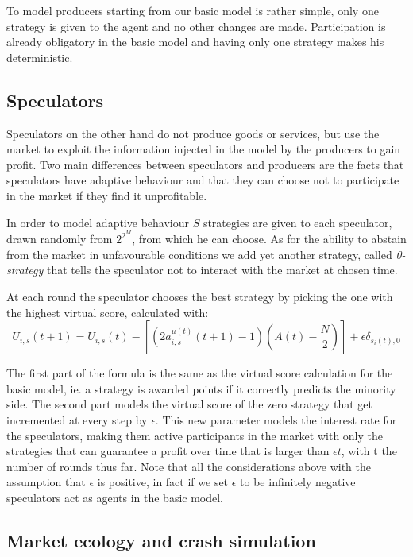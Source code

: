 To model producers starting from our basic model is rather simple, only one strategy is given to the agent and no other changes are made.
Participation is already obligatory in the basic model and having only one strategy makes his deterministic.

\subsection{Speculators}

Speculators on the other hand do not produce goods or services, but use the market to exploit the information injected in the model by the producers to gain profit.
Two main differences between speculators and producers are the facts that speculators have adaptive behaviour and that they can choose not to participate in the market if they find it unprofitable.

In order to model adaptive behaviour $S$ strategies are given to each speculator, drawn randomly from $2^{2^M}$, from which he can choose.
As for the ability to abstain from the market in unfavourable conditions we add yet another strategy, called \textit{0-strategy} that tells the speculator not to interact with the market at chosen time.

At each round the speculator chooses the best strategy by picking the one with the highest virtual score, calculated with:
\begin{displaymath}
U_{i,s}(t+1) = U_{i,s}(t) - [(2a_{i,s}^{\mu(t)}(t+1)-1)(A(t)-\frac{N}{2}) ] + \epsilon\delta_{s_i(t),0}
\end{displaymath}

The first part of the formula is the same as the virtual score calculation for the basic model, ie. a strategy is awarded points if it correctly predicts the minority side.
The second part models the virtual score of the zero strategy that get incremented at every step by $\epsilon$.
This new parameter models the interest rate for the speculators, making them active participants in the market with only the strategies that can guarantee a profit over time that is larger than $\epsilon t$, with t the number of rounds thus far.
Note that all the considerations above with the assumption that $\epsilon$ is positive, in fact if we set $\epsilon$ to be infinitely negative speculators act as agents in the basic model.

\subsection{Market ecology and crash simulation}

